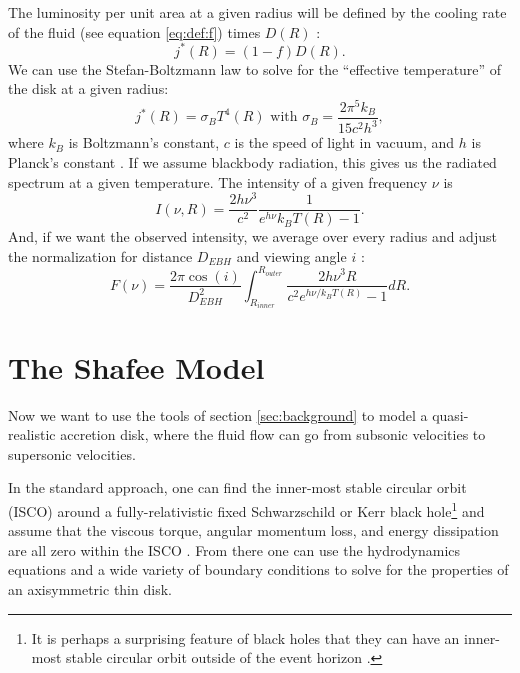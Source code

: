 \documentclass[]{article}
\begin{document}
The luminosity per unit area at a given radius will be defined by the
cooling rate of the fluid (see equation \eqref{eq:def:f}) times
$D(R)$ \cite{Shafee08}:
\begin{equation}
  \label{eq:radiant:power:disk}
  j^*(R) = (1-f) D(R).
\end{equation}
We can use the Stefan-Boltzmann law to solve for the ``effective
temperature'' of the disk at a given radius:
\begin{equation}
  \label{eq:stefan:boltzmann:law}
  j^*(R) = \sigma_B T^4(R) \text{ with } \sigma_B = \frac{2\pi^5 k_B}{15c^2 h^3},
\end{equation}
where $k_B$ is Boltzmann's constant, $c$ is the speed of light in
vacuum, and $h$ is Planck's constant \cite{Melia}. If we assume
blackbody radiation, this gives us the radiated spectrum at a given
temperature. The intensity of a given frequency $\nu$ is
\cite{TaylorZafiratosDubson}
\begin{equation}
  \label{eq:planck:spectrum}
  I(\nu,R) = \frac{2 h\nu^3}{c^2} \frac{1}{e^{h\nu}{k_BT(R)}-1}.
\end{equation}
And, if we want the observed intensity, we average over every radius
and adjust the normalization for distance $D_{EBH}$ and viewing angle
$i$ \cite{Shafee08}:
\begin{equation}
  \label{eq:observed:spectrum}
  F(\nu) = \frac{2\pi \cos(i)}{D_{EBH}^2} \int_{R_{inner}}^{R_{outer}} \frac{2 h \nu^3 R}{c^2 e^{h\nu/k_B T(R)} -1}dR.
\end{equation}

\section{The Shafee Model}
\label{sec:the:model}

Now we want to use the tools of section \ref{sec:background} to model a
quasi-realistic accretion disk, where the fluid flow can go from
subsonic velocities to supersonic velocities.

In the standard approach, one can find the inner-most stable circular
orbit (ISCO) around a fully-relativistic fixed Schwarzschild or Kerr
black hole\footnote{It is perhaps a surprising feature of black holes
  that they can have an inner-most stable circular orbit outside of
  the event horizon \cite{Melia,Wald}.} and assume that the viscous
torque, angular momentum loss, and energy dissipation are all zero
within the ISCO \cite{Zhang97,Shafee06,McClintock06,Davis05}. From
there one can use the hydrodynamics equations and a wide variety of
boundary conditions to solve for the properties of an axisymmetric
thin disk.
\end{document}
